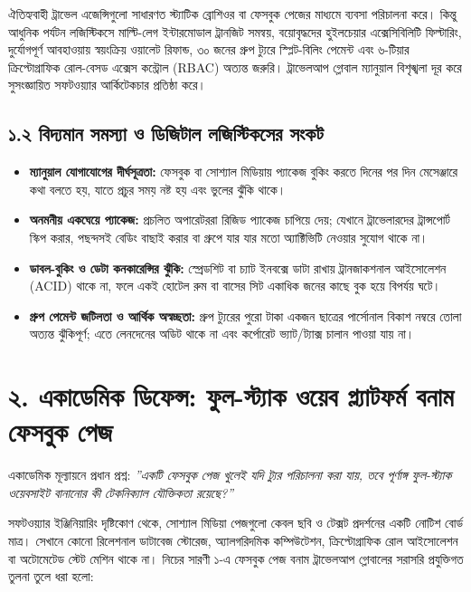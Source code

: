 \documentclass[11pt,a4paper]{article}
\begin{document}
ঐতিহ্যবাহী ট্রাভেল এজেন্সিগুলো সাধারণত স্ট্যাটিক ব্রোশিওর বা ফেসবুক পেজের মাধ্যমে ব্যবসা পরিচালনা করে। কিন্তু আধুনিক পর্যটন লজিস্টিকসে মাল্টি-লেগ ইন্টারমোডাল ট্রানজিট সমন্বয়, বয়োবৃদ্ধদের হুইলচেয়ার এক্সেসিবিলিটি ফিল্টারিং, দুর্যোগপূর্ণ আবহাওয়ায় স্বয়ংক্রিয় ওয়ালেট রিফান্ড, ৩০ জনের গ্রুপ ট্যুরে স্প্লিট-বিলিং পেমেন্ট এবং ৬-টিয়ার ক্রিপ্টোগ্রাফিক রোল-বেসড এক্সেস কন্ট্রোল (RBAC) অত্যন্ত জরুরি। ট্রাভেলআপ গ্লোবাল ম্যানুয়াল বিশৃঙ্খলা দূর করে সুসংজ্ঞায়িত সফটওয়্যার আর্কিটেকচার প্রতিষ্ঠা করে।

\subsection{১.২ বিদ্যমান সমস্যা ও ডিজিটাল লজিস্টিকসের সংকট}
\begin{itemize}[leftmargin=*]
    \item \textbf{ম্যানুয়াল যোগাযোগের দীর্ঘসূত্রতা:} ফেসবুক বা সোশ্যাল মিডিয়ায় প্যাকেজ বুকিং করতে দিনের পর দিন মেসেঞ্জারে কথা বলতে হয়, যাতে প্রচুর সময় নষ্ট হয় এবং ভুলের ঝুঁকি থাকে।
    \item \textbf{অনমনীয় একঘেয়ে প্যাকেজ:} প্রচলিত অপারেটররা রিজিড প্যাকেজ চাপিয়ে দেয়; যেখানে ট্রাভেলারদের ট্রান্সপোর্ট স্কিপ করার, পছন্দসই বেডিং বাছাই করার বা গ্রুপে যার যার মতো অ্যাক্টিভিটি নেওয়ার সুযোগ থাকে না।
    \item \textbf{ডাবল-বুকিং ও ডেটা কনকারেন্সির ঝুঁকি:} স্প্রেডশিট বা চ্যাট ইনবক্সে ডাটা রাখায় ট্রানজাকশনাল আইসোলেশন (ACID) থাকে না, ফলে একই হোটেল রুম বা বাসের সিট একাধিক জনের কাছে বুক হয়ে বিপর্যয় ঘটে।
    \item \textbf{গ্রুপ পেমেন্ট জটিলতা ও আর্থিক অস্বচ্ছতা:} গ্রুপ ট্যুরের পুরো টাকা একজন ছাত্রের পার্সোনাল বিকাশ নম্বরে তোলা অত্যন্ত ঝুঁকিপূর্ণ; এতে লেনদেনের অডিট থাকে না এবং কর্পোরেট ভ্যাট/ট্যাক্স চালান পাওয়া যায় না।
\end{itemize}

\section{২. একাডেমিক ডিফেন্স: ফুল-স্ট্যাক ওয়েব প্ল্যাটফর্ম বনাম ফেসবুক পেজ}

একাডেমিক মূল্যায়নে প্রধান প্রশ্ন: \textit{''একটি ফেসবুক পেজ খুলেই যদি ট্যুর পরিচালনা করা যায়, তবে পূর্ণাঙ্গ ফুল-স্ট্যাক ওয়েবসাইট বানানোর কী টেকনিক্যাল যৌক্তিকতা রয়েছে?''} 

সফটওয়্যার ইঞ্জিনিয়ারিং দৃষ্টিকোণ থেকে, সোশ্যাল মিডিয়া পেজগুলো কেবল ছবি ও টেক্সট প্রদর্শনের একটি নোটিশ বোর্ড মাত্র। সেখানে কোনো রিলেশনাল ডাটাবেজ স্টোরেজ, অ্যালগরিদমিক কম্পিউটেশন, ক্রিপ্টোগ্রাফিক রোল আইসোলেশন বা অটোমেটেড স্টেট মেশিন থাকে না। নিচের সারণী ১-এ ফেসবুক পেজ বনাম ট্রাভেলআপ গ্লোবালের সরাসরি প্রযুক্তিগত তুলনা তুলে ধরা হলো:
\end{document}
